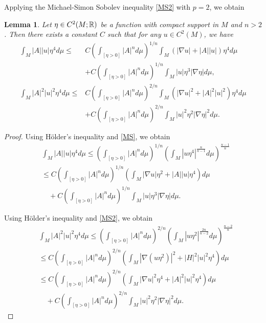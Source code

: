 \documentclass{amsart}
\newtheorem{lemma}[theorem]{Lemma}
\theoremstyle{definition}
\numberwithin{equation}{section}
\begin{document}
 Applying  the Michael-Simon Sobolev inequality \eqref{MS2} with $p=2$, we obtain
\begin{lemma} \label{L4.1}  Let $\eta\in C^2(M; \Bbb R)$ be a function with compact support in $M$ and $n>2$.
Then there exists a constant $C$ such that for any $u\in C^2(M)$, we have
\begin{align}\label{E1.1}
   \int_{M}|A| |u| \eta^4 d\mu
    \leq & C \left ( \int_{[\eta >0] } \left| A \right|^{n} d\mu \right)^{1/n}\int_{M}\left (  |\nabla  u |+ |A|  |u|
     \right  )\eta^4 d\mu  \\
    &+ C \left ( \int_{[\eta >0]} \left| A \right|^{n} d\mu \right )^{1/n} \int_{M} |u|  \eta^3 |\nabla \eta|   d\mu,\nonumber\\
    \label{E1.2}
   \int_{M}|A|^{2}|u|^2\eta^4 d\mu
    \leq & C \left ( \int_{[\eta >0] } \left| A \right|^{n} d\mu \right)^{2/n}\int_{M}\left (  |\nabla  u|^2+ |A|^2 |u|^2
     \right  )\eta^4 d\mu  \\
    &+ C \left ( \int_{[\eta >0]} \left| A \right|^{n} d\mu \right )^{2/n} \int_{M} |u|^{2} \eta^2 |\nabla \eta|^2  d\mu.\nonumber
\end{align}
 \end{lemma}
\begin{proof}
Using H\"older's inequality and  \eqref{MS}, we obtain
\begin{align}\label{E32}
       &\int_{M}|A| |u| \eta^4 d\mu \leq \left ( \int_{[\eta >0] } \left| A \right|^{n} d\mu \right)^{1/n}
       \left ( \int_{M} |u   \eta^4|^{\frac {n}{n-1}} d\mu\right )^{\frac {n-1}n}\\
    &  \leq C\left ( \int_{[\eta >0] } \left| A \right|^{n} d\mu \right)^{1/n}
       \left ( \int_{M}|\nabla  u   | \eta^2 + |A|   |u|   \eta^4 \right )d\mu \nonumber \\
       &\quad + C \left ( \int_{[\eta >0]} \left| A \right|^{n} d\mu \right )^{1/n} \int_{M} |u|  \eta^3  |\nabla \eta|   d\mu\nonumber.
\end{align}






Using H\"older's inequality and  \eqref{MS2}, we obtain
\begin{align}\label{E32}
       &\int_{M}|A|^{2}|u|^2 \eta^4 d\mu \leq \left ( \int_{[\eta >0] } \left| A \right|^{n} d\mu \right)^{2/n}
       \left ( \int_{M} |u   \eta^2|^{\frac {2n}{n-2}} d\mu\right )^{\frac {n-2}n}\\
        & \leq C\left ( \int_{[\eta >0] } \left| A \right|^{n} d\mu \right)^{2/n}
       \left ( \int_{M}|\nabla ( u   \eta^2)|^{2}+ |H|^2  |u|^2  \eta^4 \right )d\mu \nonumber\\
    &  \leq C\left ( \int_{[\eta >0] } \left| A \right|^{n} d\mu \right)^{2/n}
       \left ( \int_{M}|\nabla  u   |^{2}\eta^4 + |A|^2  |u|^2  \eta^4 \right )d\mu \nonumber \\
       &\quad + C \left ( \int_{[\eta >0]} \left| A \right|^{n} d\mu \right )^{2/n} \int_{M} |u|^{2} \eta^2 |\nabla \eta|^2  d\mu\nonumber.
\end{align}
\end{proof}
\end{document}
